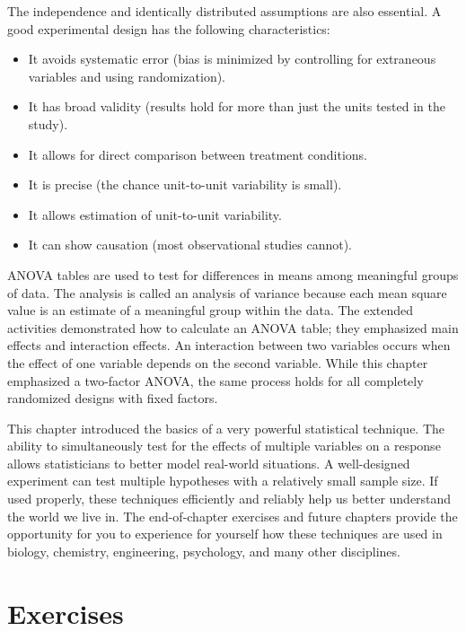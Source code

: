 \documentclass[
]{book}
\begin{document}
The independence and identically distributed assumptions are also essential. A good experimental design has the following characteristics:

\begin{itemize}
    \item It avoids systematic error (bias is minimized by controlling for extraneous variables and using randomization).
    \item It has broad validity (results hold for more than just the units tested in the study).
    \item It allows for direct comparison between treatment conditions.
    \item It is precise (the chance unit-to-unit variability is small).
    \item It allows estimation of unit-to-unit variability.
    \item It can show causation (most observational studies cannot).
\end{itemize}

ANOVA tables are used to test for differences in means among meaningful groups of data. The analysis is called an analysis of variance because each mean square value is an estimate of a meaningful group within the data. The extended activities demonstrated how to calculate an ANOVA table; they emphasized main effects and interaction effects. An interaction between two variables occurs when the effect of one variable depends on the second variable. While this chapter emphasized a two-factor ANOVA, the same process holds for all completely randomized designs with fixed factors.

This chapter introduced the basics of a very powerful statistical technique. The ability to simultaneously test for the effects of multiple variables on a response allows statisticians to better model real-world situations. A well-designed experiment can test multiple hypotheses with a relatively small sample size. If used properly, these techniques efficiently and reliably help us better understand the world we live in. The end-of-chapter exercises and future chapters provide the opportunity for you to experience for yourself how these techniques are used in biology, chemistry, engineering, psychology, and many other disciplines.

\hypertarget{exercises-3}{%
\section{Exercises}\label{exercises-3}}
\end{document}
